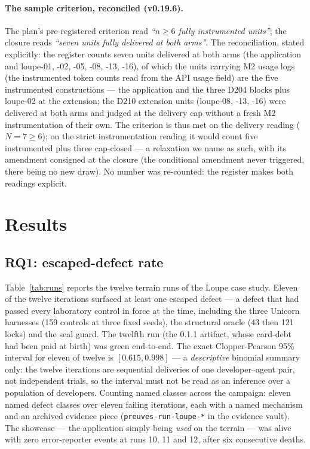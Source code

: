 \documentclass[11pt,a4paper]{article}
\newcommand{\code}[1]{\texttt{\small #1}}
\begin{document}
\paragraph{The sample criterion, reconciled (v0.19.6).} The plan's
pre-registered criterion read \emph{``$n\ge6$ fully instrumented
units''}; the closure reads \emph{``seven units fully delivered at
both arms''}. The reconciliation, stated explicitly: the register
counts seven units delivered at both arms (the application and
loupe-01, -02, -05, -08, -13, -16), of which the units carrying
M2 usage logs (the instrumented token counts read from the API
usage field) are the five instrumented constructions --- the
application and the three D204 blocks plus loupe-02 at the
extension; the D210 extension units (loupe-08, -13, -16) were
delivered at both arms and judged at the delivery cap without a
fresh M2 instrumentation of their own. The criterion is thus met
on the delivery reading ($N{=}7\ge6$); on the strict instrumentation
reading it would count five instrumented plus three cap-closed ---
a relaxation we name as such, with its amendment consigned at the
closure (the conditional amendment never triggered, there being no
new draw). No number was re-counted: the register makes both
readings explicit.

\section{Results}\label{sec:results}

\subsection{RQ1: escaped-defect rate}\label{sec:rq1}

Table~\ref{tab:runs} reports the twelve terrain runs of the Loupe case
study. Eleven of the twelve iterations surfaced at least one escaped
defect --- a defect that had passed every laboratory control in force at
the time, including the three Unicorn harnesses (159 controls at three
fixed seeds), the structural oracle (43 then 121 locks) and the seal
guard. The twelfth run (the 0.1.1 artifact, whose card-debt had been paid
at birth) was green end-to-end. The exact Clopper-Pearson 95\% interval
for eleven of twelve is $[0.615, 0.998]$ --- a \emph{descriptive}
binomial summary only: the twelve iterations are sequential deliveries
of one developer--agent pair, not independent trials, so the interval
must not be read as an inference over a population of developers.
Counting named classes across the
campaign: eleven named defect classes over eleven failing iterations,
each with a named mechanism and an archived evidence piece
(\code{preuves-run-loupe-*} in the evidence vault). The showcase ---
the application simply being \emph{used} on the terrain --- was alive with
zero error-reporter events at runs 10, 11 and 12, after six consecutive
deaths.
\end{document}
